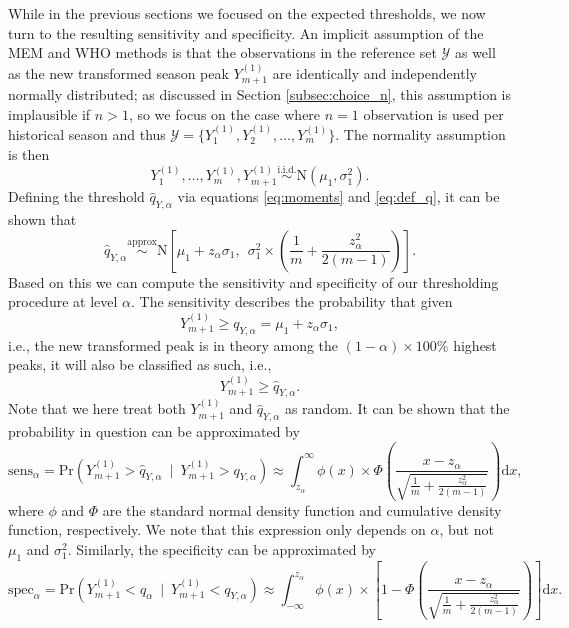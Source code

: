 \documentclass{article}
\begin{document}
While in the previous sections we focused on the expected thresholds, we now turn to the resulting sensitivity and specificity. An implicit assumption of the MEM and WHO methods is that the observations in the reference set $\mathcal{Y}$ as well as the new transformed season peak $Y_{m + 1}^{(1)}$ are identically and independently normally distributed; as discussed in Section \ref{subsec:choice_n}, this assumption is implausible if $n > 1$, so we focus on the case where $n = 1$ observation is used per historical season and thus $\mathcal{Y} = \{Y_1^{(1)}, Y_2^{(1)}, \dots, Y_m^{(1)}\}$. The normality assumption is then
$$
Y_1^{(1)}, \dots, Y_m^{(1)}, Y_{m + 1}^{(1)} \stackrel{\text{i.i.d.}}{\sim} \text{N}(\mu_1, \sigma^2_1).
$$
Defining the threshold $\hat{q}_{Y, \alpha}$ via equations \eqref{eq:moments} and \eqref{eq:def_q}, it can be shown that
\begin{equation}
\hat{q}_{Y, \alpha} \stackrel{\text{approx}}{\sim} \text{N}\left[\mu_1 + z_\alpha \sigma_1,\ \ \sigma_1^2 \times \left(\frac{1}{m} + \frac{z_\alpha^2}{2(m - 1)} \right) \right].
\label{eq:q_Y}
\end{equation}
Based on this we can compute the sensitivity and specificity of our thresholding procedure at level $\alpha$. The sensitivity describes the probability that given
$$
Y_{m + 1}^{(1)} \geq q_{Y, \alpha} = \mu_1 + z_\alpha \sigma_1,
$$
i.e., the new transformed peak is in theory among the $(1 - \alpha) \times 100\%$ highest peaks, it will also be classified as such, i.e.,
$$
Y_{m + 1}^{(1)} \geq \hat{q}_{Y, \alpha}.
$$
Note that we here treat both $Y_{m + 1}^{(1)}$ and $\hat{q}_{Y, \alpha}$ as random. It can be shown that the probability in question can be approximated by
\begin{equation}
\text{sens}_\alpha = \text{Pr}(Y_{m + 1}^{(1)} > \hat{q}_{Y, \alpha} \ \mid \ Y_{m + 1}^{(1)} > q_{Y, \alpha}) \approx \int_{z_\alpha}^\infty \phi(x) \times \Phi\left(\frac{x - z_\alpha}{\sqrt{\frac{1}{m} + \frac{z_\alpha^2}{2(m - 1)}}}\right) \text{d}x,
\label{eq:sens}
\end{equation}
where $\phi$ and $\Phi$ are the standard normal density function and cumulative density function, respectively. We note that this expression only depends on $\alpha$, but not $\mu_1$ and $\sigma^2_1$. Similarly, the specificity can be approximated by
\begin{equation}
\text{spec}_\alpha = \text{Pr}(Y_{m + 1}^{(1)} < \hat{q}_\alpha \ \mid \ Y_{m + 1}^{(1)} < q_{Y, \alpha}) \approx \int_{-\infty}^{z_\alpha}\phi(x) \times \left[1 - \Phi\left(\frac{x - z_\alpha}{\sqrt{\frac{1}{m} + \frac{z_\alpha^2}{2(m - 1)}}}\right)\right] \text{d}x.
\label{eq:spec}
\end{equation}
\end{document}
